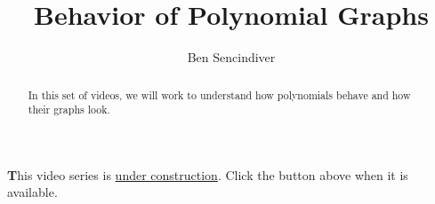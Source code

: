 \documentclass{ximera}
\title[Prerequisite Videos: ]{Behavior of Polynomial Graphs}
\author{Ben Sencindiver}
\begin{document}
\begin{abstract}
   In this set of videos, we will work to understand how 
   polynomials behave and how their graphs look.
\end{abstract}
\maketitle



{\textbf This video series is \underline{under construction}. Click the  button above when it is available}.
\end{document}
